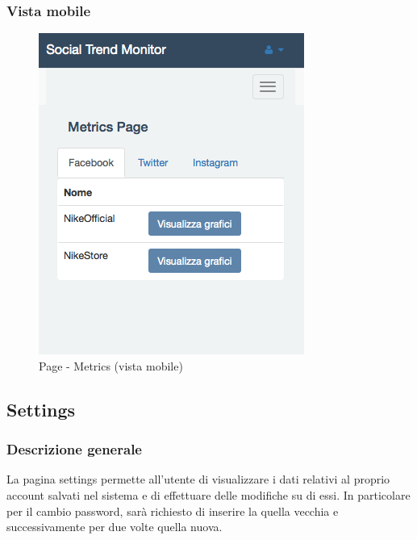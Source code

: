 		\subsubsection{Vista mobile} %
		\begin{figure}[htbp]
			\centering
			\centerline{\includegraphics[scale=0.5]{./images/mockup/metrics_vm.png}}
			\caption{Page - Metrics (vista mobile)}
		\end{figure}

	\subsection{Settings} %
	\label{sub:settings}
		\subsubsection{Descrizione generale} %
		La pagina settings permette all'utente di visualizzare i dati relativi al proprio account salvati nel sistema e di effettuare delle modifiche su di essi. In particolare per il cambio password, sarà richiesto di inserire la quella vecchia e successivamente per due volte quella nuova.

